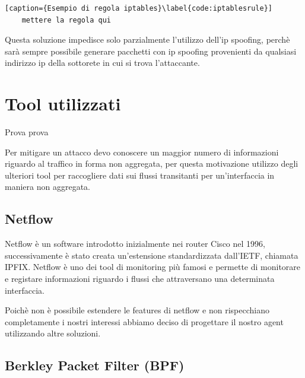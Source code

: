 \begin{lstlisting}[caption={Esempio di regola iptables}\label{code:iptablesrule}]
    mettere la regola qui
\end{lstlisting}
Questa soluzione impedisce solo parzialmente l'utilizzo dell'ip spoofing, perchè sarà sempre possibile generare pacchetti con ip spoofing provenienti da qualsiasi indirizzo ip della sottorete in cui si trova l'attaccante.


\section{Tool utilizzati}
Prova prova

Per mitigare un attacco devo conoscere un maggior numero di informazioni riguardo al traffico in forma non aggregata, per questa motivazione utilizzo degli ulteriori tool per raccogliere dati sui flussi transitanti per un'interfaccia in maniera non aggregata.

\subsection{Netflow}

Netflow è un software introdotto inizialmente nei router Cisco nel 1996, successivamente è stato creata un'estensione standardizzata dall'IETF, chiamata IPFIX. Netflow è uno dei tool di monitoring più famosi e permette di monitorare e registare informazioni riguardo i flussi che attraversano una determinata interfaccia.





Poichè non è possibile estendere le features di netflow e non rispecchiano completamente i nostri interessi abbiamo deciso di progettare il nostro agent utilizzando altre soluzioni.

\subsection{Berkley Packet Filter (BPF)}

